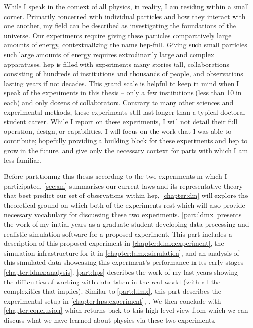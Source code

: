 While I speak in the context of all physics, in reality, I am residing within a small corner.
Primarily concerned with individual particles and how they interact with one another, my field can
be described as investigating the foundations of the universe. Our experiments require giving these
particles comparatively large amounts of energy, contextualizing the name \gls{hep-full}. Giving
such small particles such large amounts of energy requires extrodinarily large and complex
apparatuses. \gls{hep} is filled with experiments many stories tall, collaborations consisting of
hundreds of institutions and thousands of people, and observations lasting years if not decades.
This grand scale is helpful to keep in mind when I speak of the experiments in this thesis -- only
a few institutions (less than 10 in each) and only dozens of collaborators. Contrary to many other
sciences and experimental methods, these experiments still last longer than a typical doctoral
student career. While I report on these experiments, I will not detail their full operation,
design, or capabilities. I will focus on the work that I was able to contribute; hopefully
providing a building block for these experiments and \gls{hep} to grow in the future, and give only
the necessary context for parts with which I am less familiar.

Before partitioning this thesis according to the two experiments in which I participated,
\cref{sec:sm} summarizes our current laws and its representative theory that best predict our set
of observations within \gls{hep}, \cref{chapter:dm} will explore the theoretical ground on which
both of the experiments rest which will also provide necessary vocabulary for discussing these two
experiments. \cref{part:ldmx} presents the work of my initial years as a graduate student
developing data processing and realistic simulation software for a proposed experiment. This part
includes a description of this proposed experiment in \cref{chapter:ldmx:experiment}, the
simulation infrastructure for it in \cref{chapter:ldmx:simulation}, and an analysis of this
simulated data showcasing this experiment's performance in its early stages
\cref{chapter:ldmx:analysis}. \cref{part:hps} describes the work of my last years showing the
difficulties of working with data taken in the real world (with all the complexities that implies).
Similar to \cref{part:ldmx}, this part describes the experimental setup in
\cref{chapter:hps:experiment}, . We then conclude with
\cref{chapter:conclusion} which returns back to this high-level-view from which we can discuss what
we have learned about physics via these two experiments.

